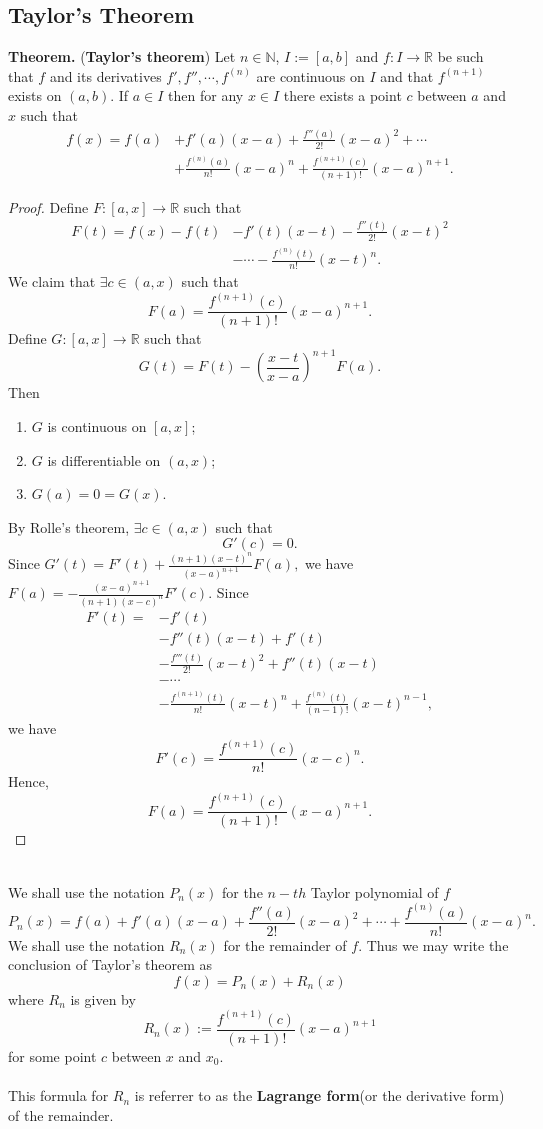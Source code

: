 \documentclass[12pt,a4paper]{article}
\newcommand{\dispsty}{\displaystyle}
\begin{document}
\subsection{Taylor's Theorem}
\newpage
\begin{tcolorbox}[enhanced, breakable, colback=white]
	\textbf{Theorem.} (\textbf{Taylor's theorem}) Let $n\in\mathbb{N}$, $I:=[a,b]$ and $f:I\to\mathbb{R}$ be such that $f$ and its derivatives $f', f'',\cdots,f^{(n)}$ are continuous on $I$ and that $f^{(n+1)}$ exists on $(a,b)$. If $a\in I$ then for any $x\in I$ there exists a point $c$ between $a$ and $x$ such that \begin{align*}
	f(x)=f(a)&+f'(a)(x-a)+\frac{f''(a)}{2!}(x-a)^2+\cdots \\
	&+\frac{f^{(n)}(a)}{n!}(x-a)^n + \frac{f^{(n+1)}(c)}{(n+1)!}(x-a)^{n+1}.
	\end{align*}\tcblower\begin{proof}
		Define $F:[a,x]\to\mathbb{R}$ such that \begin{align*}
		F(t)=f(x)-f(t)&-f'(t)(x-t)-\frac{f''(t)}{2!}(x-t)^2\\
		&-\cdots-\frac{f^{(n)}(t)}{n!}(x-t)^n.
		\end{align*} We claim that $\exists c\in(a,x)$ such that \[
		F(a)=\frac{f^{(n+1)}(c)}{(n+1)!}(x-a)^{n+1}.
		\] Define $G:[a,x]\to\mathbb{R}$ such that \[
		G(t)=F(t)-\left(\frac{x-t}{x-a}\right)^{n+1}F(a).
		\] Then \begin{enumerate}[($i$)]
			\item $G$ is continuous on $[a,x]$;
			\item $G$ is differentiable on $(a,x)$;
			\item $G(a)=0=G(x)$.
		\end{enumerate} By Rolle's theorem, $\exists c\in(a,x)$ such that \[
	G'(c)=0.
	\] Since $\dispsty
	G'(t)=F'(t)+\frac{(n+1)(x-t)^n}{(x-a)^{n+1}}F(a),
	$ we have $\dispsty
	F(a)= -\frac{(x-a)^{n+1}}{(n+1)(x-c)^n}F'(c).
	$ Since \begin{align*}
	F'(t) =& -f'(t) \\
	&-f''(t)(x-t)+f'(t) \\
	&-\frac{f'''(t)}{2!}(x-t)^2+f''(t)(x-t) \\
	&-\cdots \\
	&-\frac{f^{(n+1)}(t)}{n!}(x-t)^n+\frac{f^{(n)}(t)}{(n-1)!}(x-t)^{n-1},
	\end{align*} we have \[
	F'(c)=\frac{f^{(n+1)}(c)}{n!}(x-c)^n.
	\] Hence, \[
	F(a)= \frac{f^{(n+1)}(c)}{(n+1)!}(x-a)^{n+1}.
	\]
	\end{proof}
\end{tcolorbox}
\
\\
We shall use the notation $P_n(x)$ for the $n-th$ Taylor polynomial of $f$ \[
P_n(x)=f(a)+f'(a)(x-a)+\frac{f''(a)}{2!}(x-a)^2+\cdots+\frac{f^{(n)}(a)}{n!}(x-a)^n.
\] We shall use the notation $R_n(x)$ for the remainder of $f$. Thus we may write the conclusion of Taylor's theorem as \[
f(x)=P_n(x)+R_n(x)
\] where $R_n$ is given by \[
R_n(x):=\frac{f^{(n+1)}(c)}{(n+1)!}(x-a)^{n+1}
\] for some point $c$ between $x$ and $x_0$.\\
\\
This formula for $R_n$ is referrer to as the \textbf{Lagrange form}(or the derivative form) of the remainder.
\end{document}
